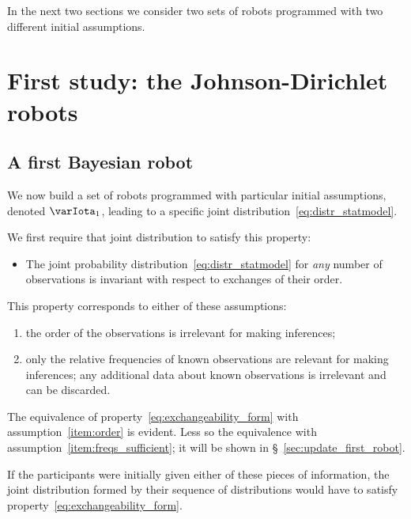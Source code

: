 \documentclass[\ifafour a4paper,12pt,\else a5paper,10pt,\fi%
onecolumn,oneside,article,%
british%
]{memoir}
\theoremstyle{remark}
\theoremstyle{innote}
\renewcommand*{\|}{\mathpunct{|}}
\newcommand*{\sect}{\S}%
\newcommand*{\yI}{\varIota}
\newcommand*{\yMJ}{\yI_1}
\begin{document}
In the next two sections we consider two sets of robots programmed with two
different initial assumptions.

\section{First study: the Johnson-Dirichlet robots}
\label{sec:first_study}

\subsection{A first Bayesian robot}
\label{sec:bayes_robot}

We now build a set of robots programmed with particular initial
assumptions, denoted $\yMJ$, leading to a specific joint
distribution~\eqref{eq:distr_statmodel}.

We first require that joint distribution to satisfy this property:
\begin{itemize}
\item The joint probability distribution~\eqref{eq:distr_statmodel} for
  \emph{any} number of observations is invariant with respect to exchanges
  of their order.
\end{itemize}
This property corresponds to either of these assumptions:
\begin{enumerate}[label=(\textit{\alph*})]
\item\label{item:order}the order of the observations is irrelevant for
  making inferences;
\item\label{item:freqs_sufficient}only the relative frequencies of known
  observations are relevant for making inferences; any additional data
  about known observations is irrelevant and can be discarded.
\end{enumerate}
The equivalence of property~\eqref{eq:exchangeability_form} with
assumption~\ref{item:order} is evident. Less so the equivalence with
assumption~\ref{item:freqs_sufficient}; it will be shown in
\sect~\ref{sec:update_first_robot}.

If the participants were initially given either of these pieces of
information, the joint distribution formed by their sequence of
distributions would have to satisfy
property~\eqref{eq:exchangeability_form}.
\end{document}
